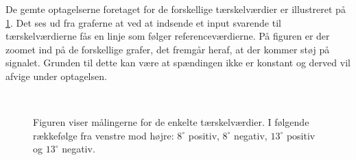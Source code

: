 De gemte optagelserne foretaget for de forskellige tærskelværdier er illustreret på \ref{fig:software_grafer}. Det ses ud fra graferne at ved at indsende et input svarende til tærskelværdierne fås en linje som følger referenceværdierne. På figuren er der zoomet ind på de forskellige grafer, det fremgår heraf, at der kommer støj på signalet. Grunden til dette kan være at spændingen ikke er konstant og derved vil afvige under optagelsen. 
\begin{figure}[h]
\\[0.5cm]%
%
\caption{Figuren viser målingerne for de enkelte tærskelværdier. I følgende rækkefølge fra venstre mod højre: $8^{\circ}$ positiv, $8^{\circ}$ negativ, $13^{\circ}$ positiv og $13^{\circ}$ negativ.}
\label{fig:software_grafer}
\end{figure}

